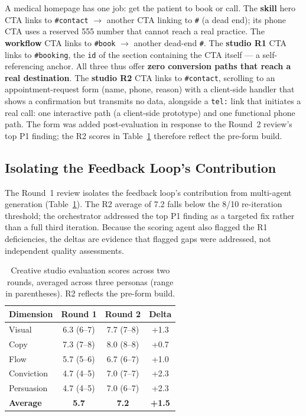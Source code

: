 \documentclass[a4paper]{llncs}
\begin{document}
A medical homepage has one job: get the patient to book or call. The
\textbf{skill} hero CTA links to \texttt{\#contact} $\rightarrow$ another CTA
linking to \texttt{\#} (a dead end); its phone CTA uses a reserved 555 number
that cannot reach a real practice. The \textbf{workflow} CTA links to
\texttt{\#book} $\rightarrow$ another dead-end \texttt{\#}. The \textbf{studio
R1} CTA links to \texttt{\#booking}, the \texttt{id} of the section containing
the CTA itself --- a self-referencing anchor. All three thus offer \textbf{zero
conversion paths that reach a real destination}. The \textbf{studio R2} CTA
links to \texttt{\#contact}, scrolling to an appointment-request form (name,
phone, reason) with a client-side handler that shows a confirmation but
transmits no data, alongside a \texttt{tel:} link that initiates a real call:
one interactive path (a client-side prototype) and one functional phone path.
The form was added post-evaluation in response to the Round~2 review's top P1
finding; the R2 scores in Table~\ref{tab:scores} therefore reflect the pre-form
build.

\subsection{Isolating the Feedback Loop's Contribution}
\label{subsec:isolating}

The Round~1 review isolates the feedback loop's contribution from multi-agent
generation (Table~\ref{tab:scores}). The R2 average of 7.2 falls below the
8/10 re-iteration threshold; the orchestrator addressed the top P1 finding as a
targeted fix rather than a full third iteration. Because the scoring agent also
flagged the R1 deficiencies, the deltas are evidence that flagged gaps were
addressed, not independent quality assessments.

\begin{table}[ht]
\caption{Creative studio evaluation scores across two rounds, averaged across
three personas (range in parentheses). R2 reflects the pre-form build.}
\label{tab:scores}
\centering
\small
\begin{tabular}{lccc}
\toprule
Dimension & Round 1 & Round 2 & Delta \\
\midrule
Visual & 6.3 (6--7) & 7.7 (7--8) & +1.3 \\
Copy & 7.3 (7--8) & 8.0 (8--8) & +0.7 \\
Flow & 5.7 (5--6) & 6.7 (6--7) & +1.0 \\
Conviction & 4.7 (4--5) & 7.0 (7--7) & +2.3 \\
Persuasion & 4.7 (4--5) & 7.0 (6--7) & +2.3 \\
\textbf{Average} & \textbf{5.7} & \textbf{7.2} & \textbf{+1.5} \\
\bottomrule
\end{tabular}
\end{table}
\end{document}
